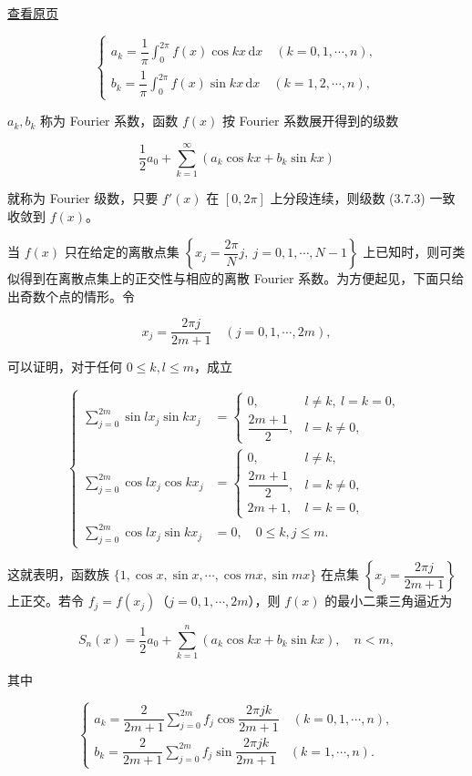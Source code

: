 \href{source-images/pdf-085.jpeg}{查看原页}

\[
\begin{cases}
a_k=\dfrac1\pi\displaystyle\int_0^{2\pi}f(x)\cos kx\,\mathrm dx\quad(k=0,1,\cdots,n),\\[4pt]
b_k=\dfrac1\pi\displaystyle\int_0^{2\pi}f(x)\sin kx\,\mathrm dx\quad(k=1,2,\cdots,n),
\end{cases}\tag{3.7.2}
\]

\(a_k,b_k\) 称为 Fourier 系数，函数 \(f(x)\) 按 Fourier 系数展开得到的级数

\[
\frac12a_0+\sum_{k=1}^{\infty}(a_k\cos kx+b_k\sin kx)\tag{3.7.3}
\]

就称为 Fourier 级数，只要 \(f'(x)\) 在 \([0,2\pi]\) 上分段连续，则级数 (3.7.3) 一致收敛到 \(f(x)\)。

当 \(f(x)\) 只在给定的离散点集 \(\left\{x_j=\dfrac{2\pi}{N}j,\ j=0,1,\cdots,N-1\right\}\) 上已知时，则可类似得到在离散点集上的正交性与相应的离散 Fourier 系数。为方便起见，下面只给出奇数个点的情形。令

\[
x_j=\frac{2\pi j}{2m+1}\quad(j=0,1,\cdots,2m),
\]

可以证明，对于任何 \(0\leqslant k,l\leqslant m\)，成立

\[
\left\{\begin{aligned}
\sum_{j=0}^{2m}\sin lx_j\sin kx_j&=\begin{cases}
0,&l\ne k,\ l=k=0,\\
\dfrac{2m+1}{2},&l=k\ne0,
\end{cases}\\[4pt]
\sum_{j=0}^{2m}\cos lx_j\cos kx_j&=\begin{cases}
0,&l\ne k,\\
\dfrac{2m+1}{2},&l=k\ne0,\\
2m+1,&l=k=0,
\end{cases}\\[4pt]
\sum_{j=0}^{2m}\cos lx_j\sin kx_j&=0,\quad0\leqslant k,j\leqslant m.
\end{aligned}\right.
\]

这就表明，函数族 \(\{1,\cos x,\sin x,\cdots,\cos mx,\sin mx\}\) 在点集 \(\left\{x_j=\dfrac{2\pi j}{2m+1}\right\}\) 上正交。若令 \(f_j=f(x_j)\)（\(j=0,1,\cdots,2m\)），则 \(f(x)\) 的最小二乘三角逼近为

\[
S_n(x)=\frac12a_0+\sum_{k=1}^n(a_k\cos kx+b_k\sin kx),\quad n<m,
\]

其中

\[
\begin{cases}
a_k=\dfrac2{2m+1}\displaystyle\sum_{j=0}^{2m}f_j\cos\dfrac{2\pi jk}{2m+1}\quad(k=0,1,\cdots,n),\\[4pt]
b_k=\dfrac2{2m+1}\displaystyle\sum_{j=0}^{2m}f_j\sin\dfrac{2\pi jk}{2m+1}\quad(k=1,\cdots,n).
\end{cases}\tag{3.7.4}
\]

